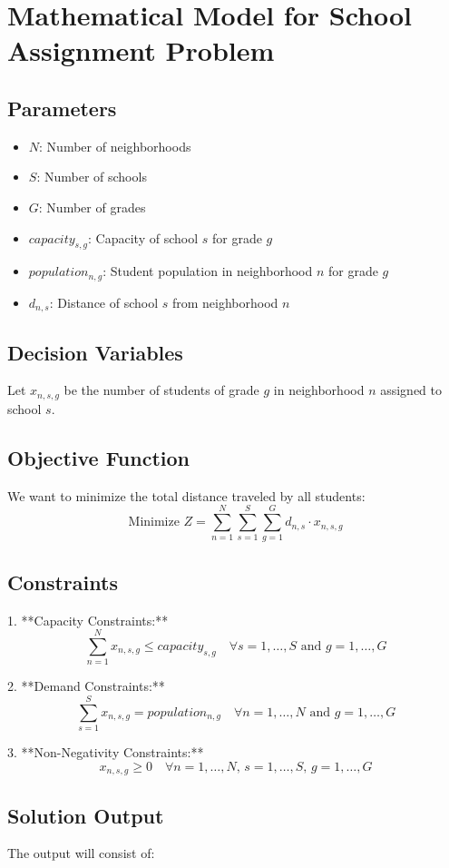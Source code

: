 \documentclass{article}
\begin{document}
\section*{Mathematical Model for School Assignment Problem}

\subsection*{Parameters}
\begin{itemize}
    \item $N$: Number of neighborhoods
    \item $S$: Number of schools
    \item $G$: Number of grades
    \item $capacity_{s,g}$: Capacity of school $s$ for grade $g$
    \item $population_{n,g}$: Student population in neighborhood $n$ for grade $g$
    \item $d_{n,s}$: Distance of school $s$ from neighborhood $n$
\end{itemize}

\subsection*{Decision Variables}
Let $x_{n,s,g}$ be the number of students of grade $g$ in neighborhood $n$ assigned to school $s$.

\subsection*{Objective Function}
We want to minimize the total distance traveled by all students:
\[
\text{Minimize } Z = \sum_{n=1}^{N} \sum_{s=1}^{S} \sum_{g=1}^{G} d_{n,s} \cdot x_{n,s,g}
\]

\subsection*{Constraints}
1. **Capacity Constraints:**
   \[
   \sum_{n=1}^{N} x_{n,s,g} \leq capacity_{s,g} \quad \forall s = 1, \ldots, S \text{ and } g = 1, \ldots, G
   \]

2. **Demand Constraints:**
   \[
   \sum_{s=1}^{S} x_{n,s,g} = population_{n,g} \quad \forall n = 1, \ldots, N \text{ and } g = 1, \ldots, G
   \]

3. **Non-Negativity Constraints:**
   \[
   x_{n,s,g} \geq 0 \quad \forall n = 1, \ldots, N,\, s = 1, \ldots, S,\, g = 1, \ldots, G
   \]

\subsection*{Solution Output}
The output will consist of:
\end{document}
